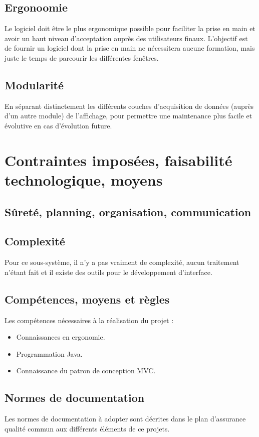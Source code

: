 \subsection{Ergonoomie}
Le logiciel doit être le plus ergonomique possible pour faciliter la prise en main et avoir un haut niveau d'acceptation auprès des utilisateurs finaux. L'objectif est de fournir un logiciel dont la prise en main ne nécessitera aucune formation, mais juste le temps de parcourir les différentes fenêtres.

\subsection{Modularité}
En séparant distinctement les différents couches d'acquisition de données (auprès d'un autre module) de l'affichage, pour permettre une maintenance plus facile et évolutive en cas d'évolution future.

\section{Contraintes imposées, faisabilité technologique, moyens}
\subsection{Sûreté, planning, organisation, communication}

\subsection{Complexité}
Pour ce sous-système, il n'y a pas vraiment de complexité, aucun traitement n'étant fait et il existe des outils pour le développement d'interface.

\subsection{Compétences, moyens et règles}
Les compétences nécessaires à la réalisation du projet :

\begin{itemize}
\item Connaissances en ergonomie.
\item Programmation Java.
\item Connaissance du patron de conception MVC.
\end{itemize}

\subsection{Normes de documentation}
Les normes de documentation à adopter sont décrites dans le plan d'assurance qualité commun aux différents éléments de ce projets.

